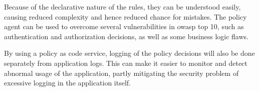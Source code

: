 Because of the declarative nature of the rules, they can be understood easily, causing reduced complexity and hence reduced chance for mistakes.
The policy agent can be used to overcome several vulnerabilities in \gls{owasp} top 10, such as authentication and authorization decisions, as well as some business logic flaws.

By using a policy as code service, logging of the policy decisions will also be done separately from application logs.
This can make it easier to monitor and detect abnormal usage of the application, partly mitigating the security problem of excessive logging in the application itself.